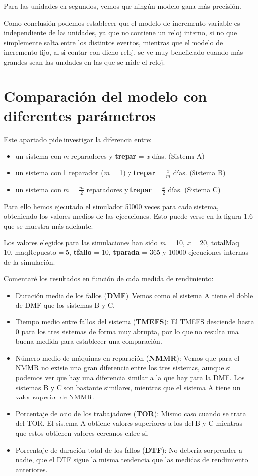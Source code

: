 Para las unidades en segundos, vemos que ningún modelo gana más precisión.

Como conclusión podemos establecer que el modelo de incremento variable es independiente de las unidades, ya que no contiene un reloj interno, si no que simplemente salta entre los distintos eventos, mientras que el modelo de incremento fijo, al si contar con dicho reloj, se ve muy beneficiado cuando más grandes sean las unidades en las que se mide el reloj.

\section{Comparación del modelo con diferentes parámetros}

Este apartado pide investigar la diferencia entre:
\begin{itemize}
	\item un sistema con \textit{m} reparadores y \textbf{trepar} = \textit{x} días. (Sistema A)
	\item un sistema con 1 reparador (\textit{m} = 1) y \textbf{trepar} = $\frac{x}{m}$ días. (Sistema B)
	\item un sistema con \textit{m} = $\frac{m}{2} $ reparadores y \textbf{trepar} = $\frac{x}{2}$ días. (Sistema C)
\end{itemize}

Para ello hemos ejecutado el simulador 50000 veces para cada sistema, obteniendo los valores medios de las ejecuciones. Esto puede verse en la figura 1.6 que se muestra más adelante.

Los valores elegidos para las simulaciones han sido \textit{m} = 10, \textit{x} = 20, totalMaq = 10, maqRepuesto = 5, \textbf{tfallo} = 10, \textbf{tparada} = 365 y 10000 ejecuciones internas de la simulación.

Comentaré los resultados en función de cada medida de rendimiento:
\begin{itemize}
	\item Duración media de los fallos (\textbf{DMF}): Vemos como el sistema A tiene el doble de DMF que los sistemas B y C.
	\item Tiempo medio entre fallos del sistema (\textbf{TMEFS}): El TMEFS desciende hasta 0 para los tres sistemas de forma muy abrupta, por lo que no resulta una buena medida para establecer una comparación.
	\item Número medio de máquinas en reparación (\textbf{NMMR}): Vemos que para el NMMR no existe una gran diferencia entre los tres sistemas, aunque si podemos ver que hay una diferencia similar a la que hay para la DMF. Los sistemas B y C son bastante similares, mientras que el sistema A tiene un valor superior de NMMR.
	\item Porcentaje de ocio de los trabajadores (\textbf{TOR}): Mismo caso cuando se trata del TOR. El sistema A obtiene valores superiores a los del B y C mientras que estos obtienen valores cercanos entre si.
	\item Porcentaje de duración total de los fallos  (\textbf{DTF}): No debería sorprender a nadie, que el DTF sigue la misma tendencia que las medidas de rendimiento anteriores.
\end{itemize}

